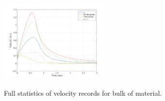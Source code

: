 \documentclass{article}
\begin{document}
\begin{figure}[H]
\begin{minipage}[b]{0.5\linewidth}
                \label{fig:Ramp-SP-Vel-P}
        \end{minipage}

        \begin{minipage}[b]{1\linewidth}
                \centering
                \includegraphics[width=0.5\textwidth]{InclinedPlane/GlobalRecords/V_Global_Vel.png}
                \label{fig:Ramp-SP-Vel-V}
        \end{minipage}
        \caption{Full statistics of velocity records for bulk of material.}
        \label{fig:Ramp-SP-Vel}
\end{figure}
\end{document}
